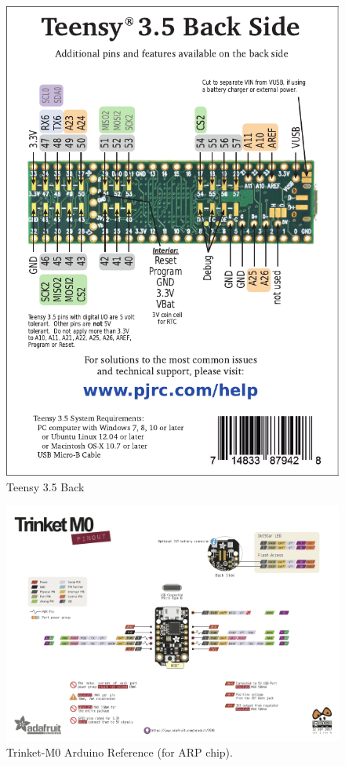 \documentclass{article}
\begin{document}
\begin{figure}[H]
    \centering
    \includegraphics[width=\textwidth]{images/card8b_rev2.pdf}
    \caption{Teensy 3.5 Back}
    \label{fig:teensy-back}
\end{figure}


\newpage

\begin{figure}[H]
    \centering
    \includegraphics[width=\textwidth]{images/trinket-m0.png}
    \caption{Trinket-M0 Arduino Reference (for ARP chip).}
    \label{fig:trinket-m0}
\end{figure}
\end{document}
